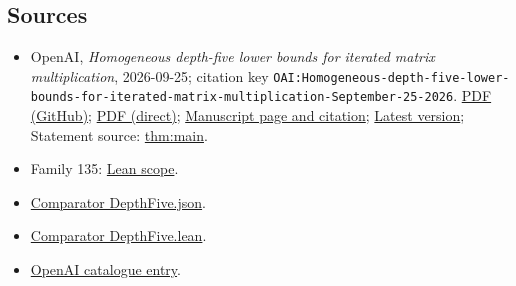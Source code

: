 \documentclass[11pt]{article}
\begin{document}
\subsection{Sources}
\begin{itemize}
\item OpenAI, \emph{Homogeneous depth-five lower bounds for iterated matrix multiplication}, 2026-09-25; citation key \texttt{OAI:Homogeneous-depth-five-lower-bounds-for-iterated-matrix-multiplication-September-25-2026}. \href{https://github.com/openai/math/blob/adc7f1241b42e322a6451854ab7e4b4c146bf78a/preprints/Homogeneous-depth-five-lower-bounds-for-iterated-matrix-multiplication-September-25-2026/Homogeneous-depth-five-lower-bounds-for-iterated-matrix-multiplication-September-25-2026.pdf}{PDF (GitHub)}; \href{https://github.com/openai/math/raw/adc7f1241b42e322a6451854ab7e4b4c146bf78a/preprints/Homogeneous-depth-five-lower-bounds-for-iterated-matrix-multiplication-September-25-2026/Homogeneous-depth-five-lower-bounds-for-iterated-matrix-multiplication-September-25-2026.pdf}{PDF (direct)}; \href{https://github.com/openai/math/blob/adc7f1241b42e322a6451854ab7e4b4c146bf78a/preprints/Homogeneous-depth-five-lower-bounds-for-iterated-matrix-multiplication-September-25-2026/README.md}{Manuscript page and citation}; \href{https://github.com/openai/math/blob/main/preprints/Homogeneous-depth-five-lower-bounds-for-iterated-matrix-multiplication-September-25-2026/Homogeneous-depth-five-lower-bounds-for-iterated-matrix-multiplication-September-25-2026.pdf}{Latest version}; Statement source: \href{https://github.com/openai/math/blob/adc7f1241b42e322a6451854ab7e4b4c146bf78a/preprints/Homogeneous-depth-five-lower-bounds-for-iterated-matrix-multiplication-September-25-2026/build/sections/01-introduction.tex\#L53}{thm:main}.
\item Family 135: \href{https://github.com/openai/math/blob/adc7f1241b42e322a6451854ab7e4b4c146bf78a/lean/docs/135.md}{Lean scope}.
\item \href{https://github.com/openai/math/blob/adc7f1241b42e322a6451854ab7e4b4c146bf78a/lean/ComparatorChallenges/DepthFive.json}{Comparator DepthFive.json}.
\item \href{https://github.com/openai/math/blob/adc7f1241b42e322a6451854ab7e4b4c146bf78a/lean/ComparatorChallenges/DepthFive.lean}{Comparator DepthFive.lean}.
\item \href{https://github.com/openai/math/blob/adc7f1241b42e322a6451854ab7e4b4c146bf78a/CONTENTS.md}{OpenAI catalogue entry}.
\end{itemize}
\end{document}
